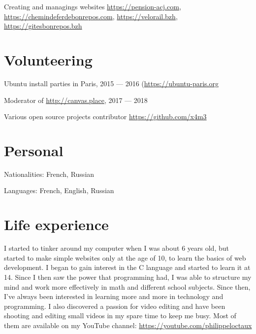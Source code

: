 \documentclass[a4paper]{article}
\begin{document}
Creating and managings websites \url{https://pension-acj.com}, \url{https://chemindeferdebonrepos.com}, \url{https://velorail.bzh}, \url{https://gitesbonrepos.bzh}

\section*{Volunteering}

Ubuntu install parties in Paris, 2015 — 2016 (\url{https://ubuntu-paris.org}

Moderator of \url{http://canvas.place}, 2017 — 2018

Various open source projects contributor \url{https://github.com/x4m3}

\section*{Personal}

Nationalities: French, Russian

Languages: French, English, Russian

\section*{Life experience}

I started to tinker around my computer when I was about 6 years old, but started to make simple websites only at the age of 10, to learn the basics of web development. I began to gain interest in the C language and started to learn it at 14. Since I then saw the power that programming had, I was able to structure my mind and work more effectively in math and different school subjects. Since then, I've always been interested in learning more and more in technology and programming. I also discovered a passion for video editing and have been shooting and editing small videos in my spare time to keep me busy. Most of them are available on my YouTube channel: \url{https://youtube.com/philippeloctaux}
\end{document}
